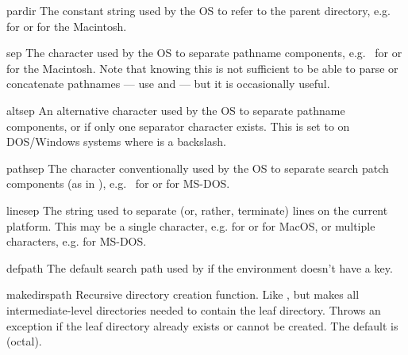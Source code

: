 \begin{datadesc}{pardir}
The constant string used by the OS to refer to the parent directory,
e.g.\  for \POSIX{} or  for the Macintosh.
\end{datadesc}

\begin{datadesc}{sep}
The character used by the OS to separate pathname components,
e.g.\ \character{/} for \POSIX{} or \character{:} for the Macintosh.
Note that knowing this is not sufficient to be able to parse or
concatenate pathnames --- use  and
 --- but it is occasionally useful.
\end{datadesc}

\begin{datadesc}{altsep}
An alternative character used by the OS to separate pathname components,
or  if only one separator character exists.  This is set to
\character{/} on DOS/Windows systems where  is a backslash.
\end{datadesc}

\begin{datadesc}{pathsep}
The character conventionally used by the OS to separate search patch
components (as in ), e.g.\ \character{:} for \POSIX{} or
\character{;} for MS-DOS.
\end{datadesc}

\begin{datadesc}{linesep}
The string used to separate (or, rather, terminate) lines on the
current platform.  This may be a single character, e.g. 
for \POSIX{} or  for MacOS, or multiple characters,
e.g.  for MS-DOS.
\end{datadesc}

\begin{datadesc}{defpath}
The default search path used by  if the environment
doesn't have a  key.
\end{datadesc}

\begin{funcdesc}{makedirs}{path}
Recursive directory creation function.  Like ,
but makes all intermediate-level directories needed to contain the
leaf directory.  Throws an  exception if the leaf
directory already exists or cannot be created.  The default 
is  (octal).
\end{funcdesc}

